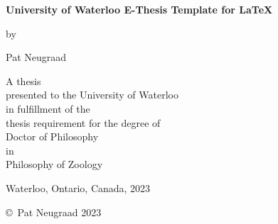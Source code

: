 \documentclass[letterpaper,12pt,titlepage,oneside,final]{book}
\begin{document}
\pagestyle{empty}

\begin{titlepage}
        \begin{center}
        \vspace*{1.0cm}

        \Huge
        {\bf University of Waterloo E-Thesis Template for \LaTeX }

        \vspace*{1.0cm}

        \normalsize
        by \\

        \vspace*{1.0cm}

        \Large
        Pat Neugraad \\

        \vspace*{3.0cm}

        \normalsize
        A thesis \\
        presented to the University of Waterloo \\ 
        in fulfillment of the \\
        thesis requirement for the degree of \\
        Doctor of Philosophy \\
        in \\
        Philosophy of Zoology \\

        \vspace*{2.0cm}

        Waterloo, Ontario, Canada, 2023 \\

        \vspace*{1.0cm}

        \copyright\ Pat Neugraad 2023 \\
        \end{center}
\end{titlepage}
\end{document}
